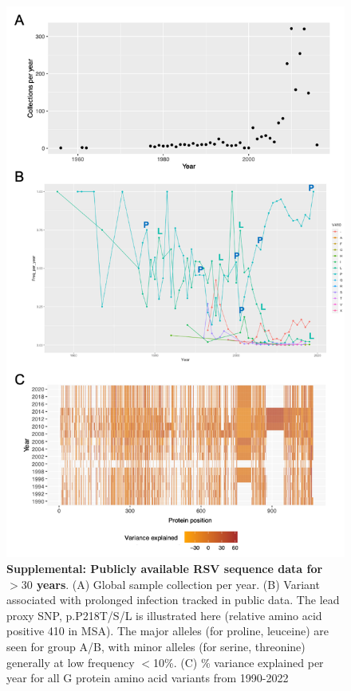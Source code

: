 \documentclass{article} %
\begin{document}
\begin{figure}[ht] \hspace{-0.5cm} \begin{center}
    \includegraphics[scale=0.6]{S2}
	\caption{\textbf{Supplemental: Publicly available RSV sequence data for $>30$ years}. (A) Global sample collection per year. (B) Variant associated with prolonged infection tracked in public data. 
	The lead proxy SNP, p.P218T/S/L is illustrated here (relative amino acid positive 410 in MSA). The major alleles (for proline, leuceine) are seen for group A/B, with minor alleles (for serine, threonine) generally at low frequency $<$10\%.
	(C) \% variance explained per year for all G protein amino acid variants from 1990-2022} 
	\label{fig:S2} \end{center}
\end{figure}
\end{document}
